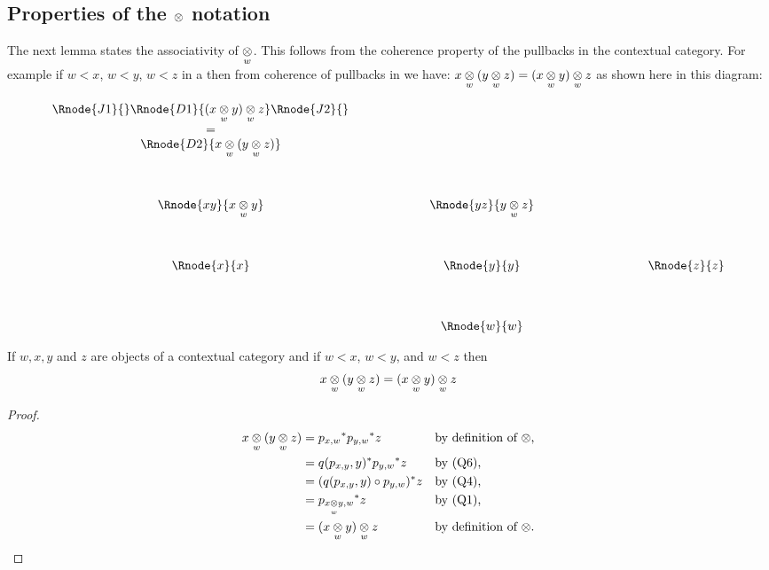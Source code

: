 \subsection{Properties of the $\cross{}{}{}$ notation}
The next lemma states the associativity of $\crossx{}{}w$. This  follows from the coherence property of the pullbacks in the contextual category. 
For example if $w < x$, $w < y$, $w < z$ in a \ccat then from coherence of pullbacks in \ccat we have:
$\crossx{x}{(\crossx{y}{z}{w})}{w} = \crossx{(\crossx{x}{y}{w})}{z}{w}$ as shown here in this diagram:
 
\begin{displaymath}
\begin{array}{cp{1.0cm}cp{1.0cm}c}
\Rnode{J1}{}\Rnode{D1} {\crossx{(\crossx{x}{y}{w})}{z}{w}}\Rnode{J2}{} \ \ \ \ \   &&  &&  \\ 
= && && \\
\Rnode{D2} {\crossx{x}{(\crossx{y}{z}{w})}{w}}    &&  &&                        \\ [1.3cm]
\Rnode{xy}{\crossx{x}{y}{w}}&& \Rnode{yz}{\crossx{y}{z}{w}} &&                      \\[1.3cm]
\Rnode{x}{x}&& \Rnode{y}{y} && \ \ \ \ \ \ \ \ \ \ \ \ \ \Rnode{z}{z}                                        \\[1.3cm]
             && \Rnode{w}{w} &&                                                     
\end{array}
\end{displaymath}

\vspace{0.15cm}
\begin{lemma}
If $w,x,y$ and $z$ are objects of a contextual category \catcw and if $w<x$, $w<y$, and $w<z$ then
\begin{equation*}
\crossx{x}{(\crossx{y}{z}{w})}{w} = \crossx{(\crossx{x}{y}{w})}{z}{w}
\end{equation*}
\end{lemma}
\begin{proof}
\begin{align*}
\crossx{x}{(\crossx{y}{z}{w})}{w} 
                   &= {p_{x,w}} ^* {p_{y,w}} ^* z             && \mbox{by definition of $\crossx{}{}{}$,}  \\
                   &= q(p_{x,y},y)^*{p_{y,w}} ^* z            && \mbox{by (Q6),}      \\
                   &= (q(p_{x,y},y) \circ p_{y,w}) ^* z       && \mbox{by (Q4),}                           \\
                   &= {p_{\crossx{x}{y}{w},w}} ^* z           && \mbox{by (Q1),}    \\
                   &= \crossx{(\crossx{x}{y}{w})}  {z}{w}     && \mbox{by definition of $\crossx{}{}{}$.}
\end{align*}
\end{proof}

